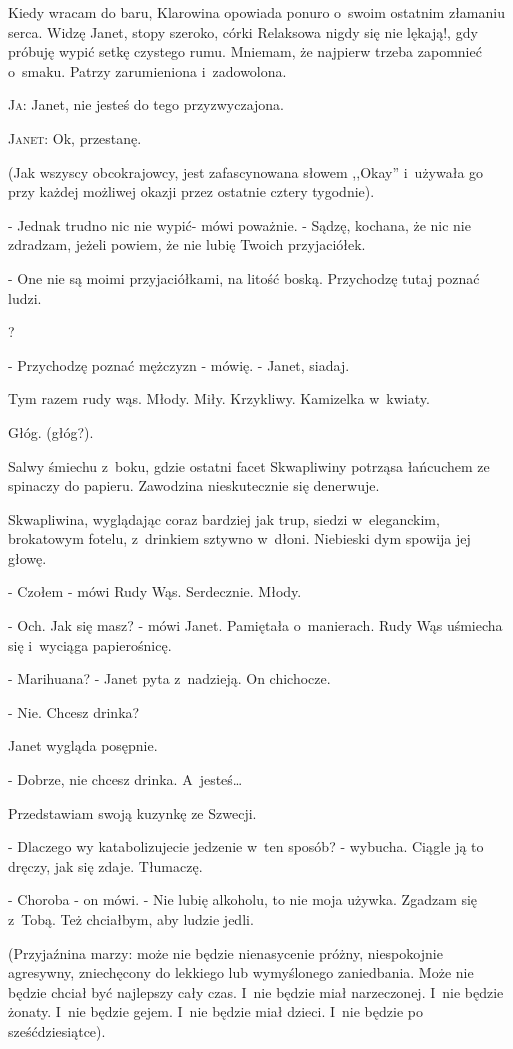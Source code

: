 \documentclass[oneside,polish,12pt,sfheadings]{mwbk}
\begin{document}
Kiedy wracam do baru, Klarowina opowiada ponuro o~swoim ostatnim złamaniu
serca. Widzę Janet, stopy szeroko, córki Relaksowa nigdy się nie lękają!,
gdy próbuję wypić setkę czystego rumu. Mniemam, że najpierw trzeba
zapomnieć o~smaku. Patrzy zarumieniona i~zadowolona.

\textsc{Ja}: Janet, nie jesteś do tego przyzwyczajona.

\textsc{Janet}: Ok, przestanę.

(Jak wszyscy obcokrajowcy, jest zafascynowana słowem ,,Okay'' i~używała
go przy każdej możliwej okazji przez ostatnie cztery tygodnie).

- Jednak trudno nic nie wypić- mówi poważnie. - Sądzę, kochana, że
nic nie zdradzam, jeżeli powiem, że nie lubię Twoich przyjaciółek.

- One nie są moimi przyjaciółkami, na litość boską. Przychodzę tutaj
poznać ludzi.

?

- Przychodzę poznać mężczyzn - mówię. - Janet, siadaj.

Tym razem rudy wąs. Młody. Miły. Krzykliwy. Kamizelka w~kwiaty.

Głóg. (głóg?).

Salwy śmiechu z~boku, gdzie ostatni facet Skwapliwiny potrząsa łańcuchem
ze spinaczy do papieru. Zawodzina nieskutecznie się denerwuje.

Skwapliwina, wyglądając coraz bardziej jak trup, siedzi w~eleganckim,
brokatowym fotelu, z~drinkiem sztywno w~dłoni. Niebieski dym spowija
jej głowę.

- Czołem - mówi Rudy Wąs. Serdecznie. Młody.

- Och. Jak się masz? - mówi Janet. Pamiętała o~manierach. Rudy Wąs
uśmiecha się i~wyciąga papierośnicę.

- Marihuana? - Janet pyta z~nadzieją. On chichocze.

- Nie. Chcesz drinka?

Janet wygląda posępnie.

- Dobrze, nie chcesz drinka. A~jesteś\ldots

Przedstawiam swoją kuzynkę ze Szwecji.

- Dlaczego wy katabolizujecie jedzenie w~ten sposób? - wybucha. Ciągle
ją to dręczy, jak się zdaje. Tłumaczę.

- Choroba - on mówi. - Nie lubię alkoholu, to nie moja używka. Zgadzam
się z~Tobą. Też chciałbym, aby ludzie jedli.

(Przyjaźnina marzy: może nie będzie nienasycenie próżny, niespokojnie
agresywny, zniechęcony do lekkiego lub wymyślonego zaniedbania. Może
nie będzie chciał być najlepszy cały czas. I~nie będzie miał narzeczonej.
I~nie będzie żonaty. I~nie będzie gejem. I~nie będzie miał dzieci.
I~nie będzie po sześćdziesiątce).
\end{document}
